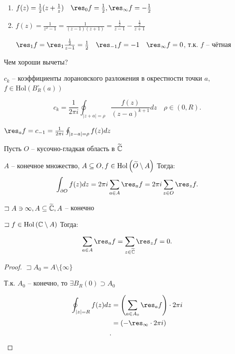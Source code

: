 \begin{example}
    \begin{enumerate}
        \item $f(z) = \frac{1}{2}(z + \frac{1}{z})\quad \res_0f = \frac{1}{2}, \res_{\infty }f = -\frac{1}{2}$
        \item $f(z) = \frac{1}{z^2 - 1} = \frac{1}{(z-1)(z+1)} = \frac{\frac{1}{2}}{z - 1} - \frac{\frac{1}{2}}{z+1}$

        $\res_1f = \res_1 \frac{\frac{1}{2}}{z - 1} = \frac{1}{2}\quad \res_{-1}f = -1\quad \res_{\infty }f = 0$, т.к. $f$ -- чётная
    \end{enumerate}
\end{example}

\begin{note}
    Чем хороши вычеты?
\end{note}

$c_k$ -- коэффициенты лорановского разложения в окрестности точки $a$, $f\in \mathrm{Hol}(B_R^\circ(a))$

\[
    c_k = \frac{1}{2\pi i} \oint _{|z+a| = \rho} \frac{f(z)}{(z-a)^{k+1}}dz\quad \rho\in(0,R)
.\]

$\res_af = c_{-1} = \frac{1}{2\pi i} \oint _{|z-a| = \rho}f(z)dz$

\begin{theorem}

    Пусть $O$ -- кусочно-гладкая область в $\widetilde{\mathbb{C}}$

    $A$ -- конечное множество, $A\subseteq O, f\in \mathrm{Hol}\left( \widetilde{O} \setminus A \right) $ Тогда:
    \[
    \int_{\partial O}f(z)dz = 2\pi i \sum_{a\in A}\res_a f = 2\pi i \sum_{z\in O}\res_zf
    .\]
\end{theorem}

\begin{theorem}

    $\sqsupset A\ni \infty , A\subseteq \widetilde{\mathbb{C}}, A$ -- конечно

    $\sqsupset f\in \mathrm{Hol}\left( \mathbb{C} \setminus A \right) $ Тогда:

    \[
    \sum_{a\in A}\res_af = \sum_{z\in \tl \C}\res_zf = 0
    .\]
\end{theorem}
\begin{proof}
    $\sqsupset A_0 = A \setminus \{\infty \}$

    Т.к. $A_0$ -- конечно, то $\exists B_R(0) \supset A_0$

    \begin{align*}
        \oint_{|z| = R} f(z)dz &= \left( \sum_{a\in A_0} \res_af \right) \cdot 2\pi i  \\
        &= \left( -\res_{\infty }\cdot 2\pi i \right)  \\
    .\end{align*}
\end{proof}


